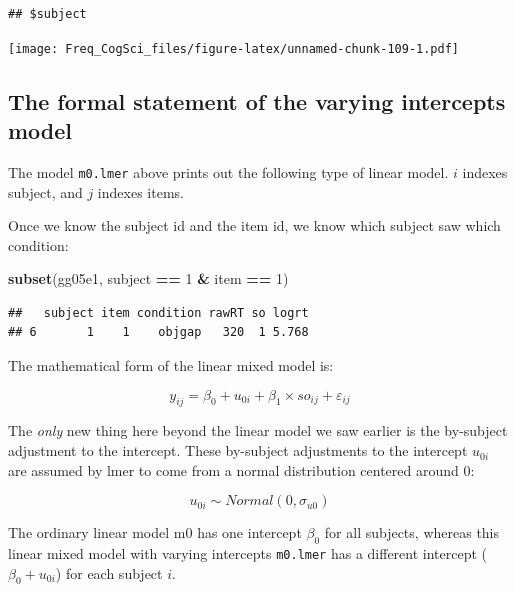 \documentclass[12pt,]{krantz}
\newenvironment{Shaded}{\begin{snugshade}}{\end{snugshade}}
\newcommand{\DecValTok}[1]{\textcolor[rgb]{0.00,0.00,0.81}{#1}}
\newcommand{\KeywordTok}[1]{\textcolor[rgb]{0.13,0.29,0.53}{\textbf{#1}}}
\newcommand{\NormalTok}[1]{#1}
\newcommand{\OperatorTok}[1]{\textcolor[rgb]{0.81,0.36,0.00}{\textbf{#1}}}
\newcommand{\StringTok}[1]{\textcolor[rgb]{0.31,0.60,0.02}{#1}}
\begin{document}
\begin{verbatim}
## $subject
\end{verbatim}

\texttt{[image: Freq\_CogSci\_files/figure-latex/unnamed-chunk-109-1.pdf]}

\hypertarget{the-formal-statement-of-the-varying-intercepts-model}{%
\subsection{The formal statement of the varying intercepts model}\label{the-formal-statement-of-the-varying-intercepts-model}}

The model \texttt{m0.lmer} above prints out the following type of linear model. \(i\) indexes subject, and \(j\) indexes items.

Once we know the subject id and the item id, we know which subject saw which condition:

\begin{Shaded}
\begin{Highlighting}[]
\KeywordTok{subset}\NormalTok{(gg05e1, subject }\OperatorTok{==}\StringTok{ }\DecValTok{1} \OperatorTok{&}\StringTok{ }\NormalTok{item }\OperatorTok{==}\StringTok{ }\DecValTok{1}\NormalTok{)}
\end{Highlighting}
\end{Shaded}

\begin{verbatim}
##   subject item condition rawRT so logrt
## 6       1    1    objgap   320  1 5.768
\end{verbatim}

The mathematical form of the linear mixed model is:

\begin{equation}
y_{ij} = \beta_0 + u_{0i}+\beta_1\times so_{ij} + \varepsilon_{ij}
\end{equation}

The \emph{only} new thing here beyond the linear model we saw earlier is the by-subject adjustment to the intercept. These by-subject adjustments to the intercept \(u_{0i}\) are assumed by lmer to come from a normal distribution centered around 0:

\begin{equation}
u_{0i} \sim Normal(0,\sigma_{u0})
\end{equation}

The ordinary linear model m0 has one intercept \(\beta_0\) for all subjects, whereas this linear mixed model with varying intercepts \texttt{m0.lmer} has a different intercept (\(\beta_0 + u_{0i}\)) for each subject \(i\).
\end{document}
